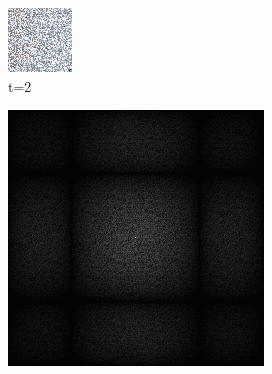 \begin{figure}[H]
\begin{tcolorbox}[boxrule=4pt,sharp corners=downhill,title=Sortieren]
\begin{subfigure}[b]{0.2\textwidth}
        \includegraphics[width=\textwidth]{content/TemporalerAlg/Bilder/Sorting/Ausschnitte/Ausschnitt2.png}
        \caption{t=2}
        \label{pic:sorting_t2}
    \end{subfigure}
    \begin{subfigure}[b]{0.2\textwidth}
        \centering
        \includegraphics[width=\textwidth]{content/TemporalerAlg/Bilder/Sorting/Spektren/Ausschnitt2.png}

\end{subfigure}
\end{tcolorbox}
\end{figure}
